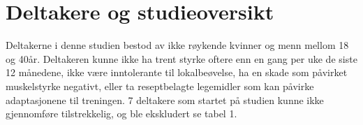 \documentclass[
]{book}
\begin{document}
\hypertarget{deltakere-og-studieoversikt}{%
\section{Deltakere og studieoversikt}\label{deltakere-og-studieoversikt}}

Deltakerne i denne studien bestod av ikke røykende kvinner og menn mellom 18 og 40år. Deltakeren kunne ikke ha trent styrke oftere enn en gang per uke de siste 12 månedene, ikke være inntolerante til lokalbeøvelse, ha en skade som påvirket muskelstyrke negativt, eller ta reseptbelagte legemidler som kan påvirke adaptasjonene til treningen. 7 deltakere som startet på studien kunne ikke gjennomføre tilstrekkelig, og ble ekskludert se tabel 1.

\providecommand{\docline}[3]{\noalign{\global\setlength{\arrayrulewidth}{#1}}\arrayrulecolor[HTML]{#2}\cline{#3}}

\setlength{\tabcolsep}{2pt}

\renewcommand*{\arraystretch}{1.5}
\end{document}
